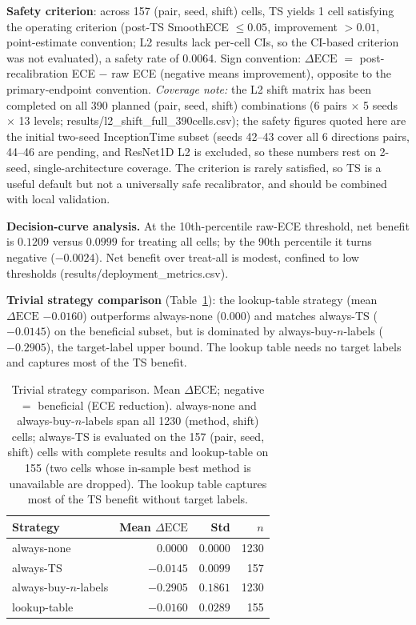 \documentclass[review,12pt,nonatbib]{elsarticle}
\begin{document}
\textbf{Safety criterion}: across 157 (pair, seed, shift) cells, TS
yields 1 cell satisfying the operating criterion (post-TS SmoothECE
$\leq 0.05$, improvement $>0.01$, point-estimate convention; L2 results
lack per-cell CIs, so the CI-based criterion was not evaluated), a safety
rate of $0.0064$. Sign convention:
$\Delta\text{ECE}$ $=$ post-recalibration ECE $-$ raw ECE (negative means
improvement), opposite to the primary-endpoint convention.
\emph{Coverage note:} the L2 shift matrix has been completed on all 390
planned (pair, seed, shift) combinations (6 pairs $\times$ 5 seeds
$\times$ 13 levels; results/l2\_shift\_full\_390cells.csv); the safety
figures quoted here are the initial two-seed InceptionTime subset (seeds
42--43 cover all 6 directions pairs, 44--46 are pending, and ResNet1D L2 is
excluded, so these numbers rest on 2-seed, single-architecture coverage. The criterion is rarely satisfied, so TS is a useful default but
not a universally safe recalibrator, and should be combined with local
validation.

\textbf{Decision-curve analysis.} At the 10th-percentile raw-ECE
threshold, net benefit is $0.1209$ versus $0.0999$ for treating all cells;
by the 90th percentile it turns negative ($-0.0024$). Net benefit over
treat-all is modest, confined to low thresholds
(results/deployment\_metrics.csv).

\textbf{Trivial strategy comparison} (Table~\ref{tab:trivial}): the
lookup-table strategy (mean $\Delta\text{ECE}$ $-0.0160$) outperforms
always-none ($0.000$) and matches always-TS ($-0.0145$) on the beneficial
subset, but is dominated by always-buy-$n$-labels ($-0.2905$), the
target-label upper bound. The lookup table needs no target labels and
captures most of the TS benefit.

\begin{table}[t]
\centering
\caption{Trivial strategy comparison. Mean $\Delta\text{ECE}$; negative $=$
beneficial (ECE reduction). always-none and always-buy-$n$-labels span
all 1230 (method, shift) cells; always-TS is evaluated on the 157
(pair, seed, shift) cells with complete results and lookup-table on
155 (two cells whose in-sample best method is unavailable are
dropped). The lookup table captures most of the TS benefit without target labels.}
\label{tab:trivial}
\begin{tabular}{lrrr}
\toprule
Strategy & Mean $\Delta\text{ECE}$ & Std & $n$ \\
\midrule
always-none            & $\phantom{-}0.0000$  & $0.0000$ & 1230 \\
always-TS              & $-0.0145$            & $0.0099$ & 157  \\
always-buy-$n$-labels  & $-0.2905$            & $0.1861$ & 1230 \\
lookup-table           & $-0.0160$            & $0.0289$ & 155  \\
\bottomrule
\end{tabular}
\end{table}
\end{document}
